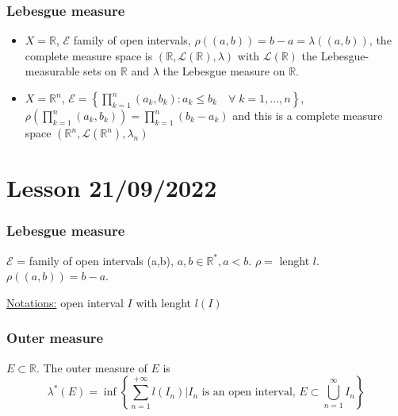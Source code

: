 \documentclass[a4paper,12pt]{article}
\theoremstyle{break}
\newcommand{\real}{\mathbb{R}}
\numberwithin{equation}{section}
\begin{document}
\subsubsection*{Lebesgue measure}
\begin{itemize}
\item \(X = \mathbb{R}\), \(\mathcal{E}\) family of open intervals, \(\rho((a,b)) = b-a = \lambda((a,b))\), the complete measure space is \((\mathbb{R}, \mathcal{L}(\mathbb{R}), \lambda)\) with \(\mathcal{L}(\mathbb{R})\) the Lebesgue-measurable sets on \(\mathbb{R}\) and \(\lambda\) the Lebesgue measure on \(\mathbb{R}\).
\item \(X = \mathbb{R}^n\), \(\mathcal{E} = \left\lbrace \prod_{k = 1}^n (a_k, b_k): a_k \leq b_k \quad \forall \; k = 1,\ldots, n \right\rbrace\), \(\rho\left(\prod_{k = 1}^n (a_k, b_k)\right) = \prod_{k=1}^n (b_k - a_k)\) and this is a complete measure space \((\mathbb{R}^n, \mathcal{L}(\mathbb{R}^n), \lambda_n)\)
\end{itemize}
\section{Lesson 21/09/2022}
\subsubsection*{Lebesgue measure}
\(\mathcal{E}\) = family of open intervals (a,b), \(a,b \in \mathbb{R}^*, a < b\). \(\rho =\) lenght \(l\).
\(\rho((a,b)) = b - a\). 

\underline{Notations:} open interval \(I\) with lenght \(l(I)\)
\subsubsection*{Outer measure}
\(E \subset \real\). The outer measure of \(E\) is 
\[
    \lambda^*(E) = \inf \left\lbrace \sum_{n=1}^{+\infty} l(I_n) \vert I_n \mbox{ is an open interval, } E \subset \bigcup_{n = 1}^{\infty} I_n \right\rbrace
\]
\end{document}
